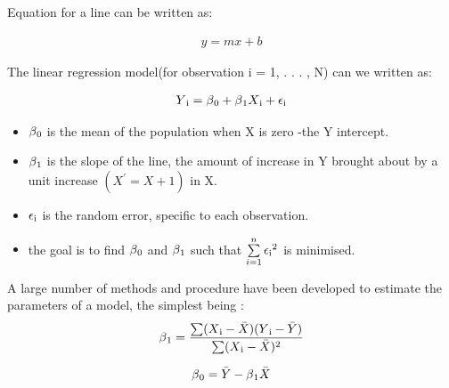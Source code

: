 {Equation for a line can be written as:

\begin{equation}
\begin{aligned}
  y= mx + b 
\label{eq:Line_equ}
\end{aligned}
\end{equation}

The linear regression model(for observation i = 1, . . . , N) can we written as:

\begin{equation}
\begin{aligned}
  Y\textsubscript{i}= \beta\textsubscript{0}+\beta\textsubscript{1}X\textsubscript{i} +\epsilon\textsubscript{i}
\label{eq:Line_equ}
\end{aligned}
\end{equation}

\begin{itemize}
\item $\beta\textsubscript{0}$ is the mean of the population when X is zero -the Y intercept.
\item $\beta\textsubscript{1}$ is the slope of the line, the amount of increase in Y brought about by a unit increase $(X^{'}= X + 1)$ in X.
\item \textbf{$\epsilon\textsubscript{i}$} is the random error, specific to each observation.
\item the goal is to find $\beta\textsubscript{0}$ and $\beta\textsubscript{1}$ such that $\sum\limits_{i=1}^n \epsilon\textsubscript{i}^2$ is minimised.
\end {itemize}
A large number of methods and procedure have been developed to estimate the parameters of a model, the simplest being :\\

\begin{equation}
	\begin{aligned}
		\beta\textsubscript{1}= \dfrac{\sum (X\textsubscript{i} - \bar{X})(Y\textsubscript{i} - \bar{Y})}{\sum (X\textsubscript{i} - \bar{X})^2} 
	\label{eq:B1_calculus}
	\end{aligned}
\end{equation}

\begin{equation}
	\begin{aligned}
		\beta\textsubscript{0}= \bar{Y}-\beta\textsubscript{1}\bar{X} 
	\label{eq:B0_calculus}
	\end{aligned}
\end{equation}

}
